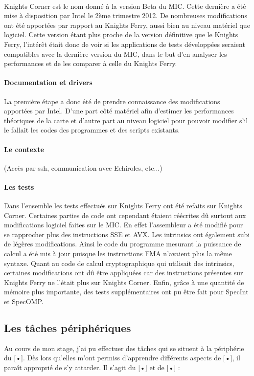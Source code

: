 \documentclass[11pt]{article}
\begin{document}
				\paragraph{}
				Knights Corner est le nom donné à la version Beta du MIC. Cette dernière a été mise à disposition par Intel le 2ème trimestre 
				2012. De nombreuses modifications ont été apportées par rapport au Knights Ferry, aussi bien au niveau matériel que logiciel. 
				Cette version étant plus proche de la version définitive que le Knights Ferry, l'intérêt était donc de voir 
				si les applications de tests développées seraient compatibles avec la dernière version du MIC, dans le but d'en 
				analyser les performances et de les comparer à celle du Knights Ferry.
				\paragraph{Documentation et drivers}
				La première étape a donc été de prendre connaissance des modifications apportées par Intel. D'une part côté 
				matériel afin d'estimer les performances théoriques de la carte et d'autre part au niveau logiciel pour pouvoir 
				modifier s'il le fallait les codes des programmes et des scripts existants.
				\paragraph{Le contexte}
				(Accès par ssh, communication avec Echiroles, etc...)
				\paragraph{Les tests}
				Dans l'ensemble les tests effectués sur Knights Ferry ont été refaits sur Knights Corner. Certaines parties 
				de code ont cependant étaient réécrites dû surtout aux modifications logiciel faites sur le MIC. En effet l'assembleur 
				a été modifié pour se rapprocher plus des instructions SSE et AVX. Les intrinsics ont également subi de légères 
				modifications. \newline
				Ainsi le code du programme mesurant la puissance de calcul a été mis à jour puisque les instructions FMA n'avaient plus la même
				syntaxe. Quant au code de calcul cryptographique qui utilisait des intrinsics, certaines modifications ont dû être 
				appliquées car des instructions présentes sur Knights Ferry ne l'était plus sur Knights Corner. Enfin, grâce à 
				une quantité de mémoire plus importante, des tests supplémentaires ont pu être fait pour SpecInt et SpecOMP.
		\subsection{Les tâches périphériques}
		Au cours de mon stage, j’ai pu effectuer des tâches qui se situent à la périphérie du [•]. Dès lors qu’elles 
		m’ont permiss d’apprendre différents aspects de [•], il paraît approprié de s’y attarder. Il s’agit du [•] et 
		de [•] :
\end{document}
